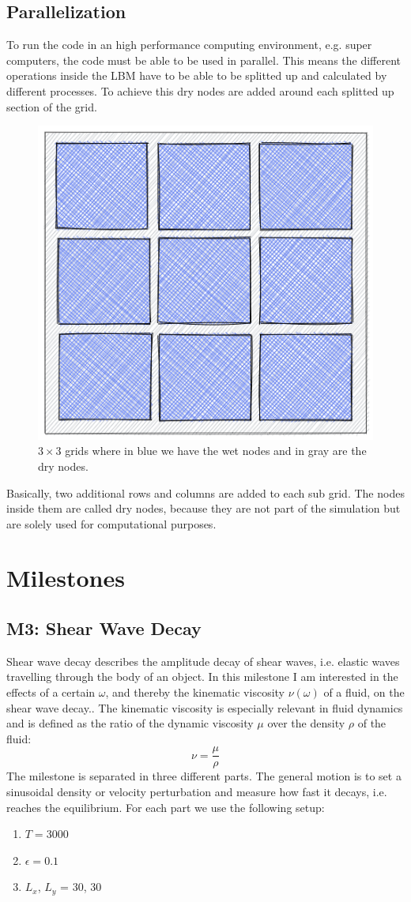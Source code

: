 \documentclass[a4paper,12pt, oneside]{book}
\begin{document}
\section{Parallelization}
To run the code in an high performance computing environment, e.g. super computers, the code must be able to be used in parallel.
This means the different operations inside the LBM have to be able to be splitted up and calculated by different processes. 
To achieve this dry nodes are added around each splitted up section of the grid.
\begin{figure}[ht]
\centering
\includegraphics[width=0.4\columnwidth]{milestones/final/img/latttice-ghost.png}
\caption[Wet and dry nodes]{$3\times3$ grids where in blue we have the wet nodes and in gray are the dry nodes.}
\label{fig:m4-1-streamplot}
\end{figure}
Basically, two additional rows and columns are added to each sub grid. The nodes inside them are called dry nodes, because they are not part of the simulation but are solely used for computational purposes.


\chapter{Milestones}
\section{M3: Shear Wave Decay}
Shear wave decay describes the amplitude decay of shear waves, i.e. elastic waves travelling through the body of an object.
In this milestone I am interested in the effects of a certain $\omega$, and thereby the kinematic viscosity $\nu(\omega)$ of a fluid, on the shear wave decay..
The kinematic viscosity is especially relevant in fluid dynamics and is defined as the ratio of the dynamic viscosity $\mu$ over the density $\rho$ of the fluid:
\begin{equation}
\nu = \frac{\mu}{\rho}
\end{equation}
The milestone is separated in three different parts. 
The general motion is to set a sinusoidal density or velocity
perturbation and measure how fast it decays, i.e. reaches the equilibrium.
For each part we use the following setup:
\begin{enumerate}
    \item $T = 3000$
    \item $\epsilon = 0.1$
    \item $L_{x}$, $L_{y}$ = 30, 30
\end{enumerate}
\end{document}
